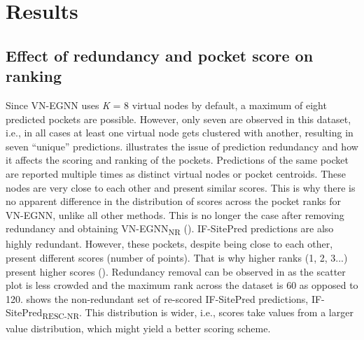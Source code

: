 \section{Results}

\subsection{Effect of redundancy and pocket score on ranking}

Since VN-EGNN uses \textit{K} = 8 virtual nodes by default, a maximum of eight predicted pockets are possible. However, only seven are observed in this dataset, i.e., in all cases at least one virtual node gets clustered with another, resulting in seven ``unique'' predictions.  illustrates the issue of prediction redundancy and how it affects the scoring and ranking of the pockets. Predictions of the same pocket are reported multiple times as distinct virtual nodes or pocket centroids. These nodes are very close to each other and present similar scores. This is why there is no apparent difference in the distribution of scores across the pocket ranks for VN-EGNN, unlike all other methods. This is no longer the case after removing redundancy and obtaining VN-EGNN\textsubscript{NR} (). IF-SitePred predictions are also highly redundant. However, these pockets, despite being close to each other, present different scores (number of points). That is why higher ranks (1, 2, 3...) present higher scores (). Redundancy removal can be observed in  as the scatter plot is less crowded and the maximum rank across the dataset is 60 as opposed to 120.  shows the non-redundant set of re-scored IF-SitePred predictions, IF-SitePred\textsubscript{RESC-NR}. This distribution is wider, i.e., scores take values from a larger value distribution, which might yield a better scoring scheme.


